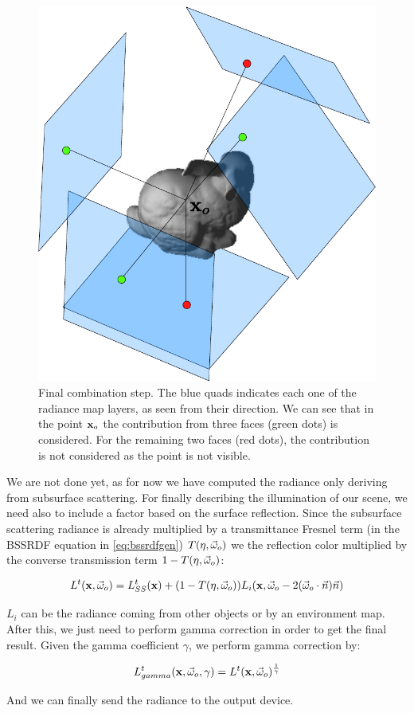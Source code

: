 \begin{figure}[!ht]
\centering
\includegraphics[width=0.6 \linewidth]{images/method/combination.pdf}
\caption{Final combination step. The blue quads indicates each one of the radiance map layers, as seen from their direction. We can see that in the point $\mathbf{x}_o$ the contribution from three faces (green dots) is considered. For the remaining two faces (red dots), the contribution is not considered as the point is not visible.}
\label{fig:step3}
\end{figure} 

We are not done yet, as for now we have computed the radiance only deriving from subsurface scattering. For finally describing the illumination of our scene, we need also to include a factor based on the surface reflection. Since the subsurface scattering radiance is already multiplied by a transmittance Fresnel term (in the BSSRDF equation in \ref{eq:bssrdfgen}) $T(\eta,\vec{\omega}_o)$ we the reflection color multiplied by the converse transmission term $1 - T(\eta,\vec{\omega}_o)$:

$$
L^t(\mathbf{x}, \vec{\omega}_o) = L_{SS}^t(\mathbf{x}) + (1 - T(\eta,\vec{\omega}_o)) L_i(\mathbf{x}, \vec{\omega}_o - 2 (\vec{\omega}_o \cdot \vec{n}) \vec{n})
$$

$L_i$ can be the radiance coming from other objects or by an environment map. After this, we just need to perform gamma correction in order to get the final result. Given the gamma coefficient $\gamma$, we perform gamma correction by:

$$
L_{gamma}^t(\mathbf{x}, \vec{\omega}_o, \gamma) = L^t(\mathbf{x},\vec{\omega}_o)^{\frac{1}{\gamma}}
$$

And we can finally send the radiance to the output device.

